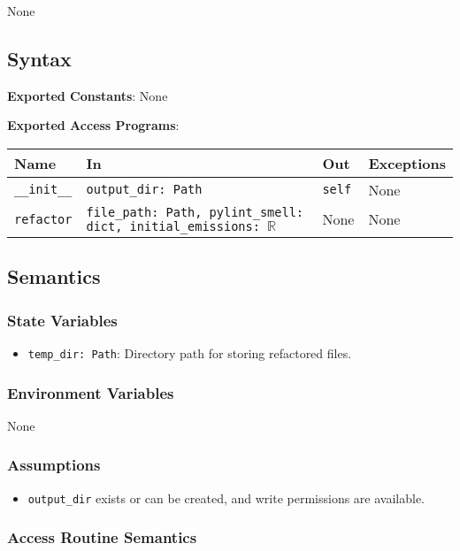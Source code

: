 \documentclass[12pt, titlepage]{article}
\begin{document}
None

\subsection{Syntax}
\noindent
\textbf{Exported Constants}: None

\noindent
\textbf{Exported Access Programs}:

\begin{tabularx}{\linewidth}{|l|>{\raggedright\arraybackslash}X|l|l|}
  \hline
  \textbf{Name} & \textbf{In} & \textbf{Out} & \textbf{Exceptions} \\\hline
  \texttt{\_\_init\_\_} & \texttt{output\_dir: Path} & \texttt{self} & None \\\hline
  \texttt{refactor} & \texttt{file\_path: Path, pylint\_smell: dict, initial\_emissions: $\mathbb{R}$} & None & None \\
  \hline
\end{tabularx}

\subsection{Semantics}

\subsubsection{State Variables}
\begin{itemize}
  \item \texttt{temp\_dir: Path}: Directory path for storing refactored files.
\end{itemize}

\subsubsection{Environment Variables}
None

\subsubsection{Assumptions}
\begin{itemize}
  \item \texttt{output\_dir} exists or can be created, and write permissions are available.
\end{itemize}

\subsubsection{Access Routine Semantics}
\end{document}
